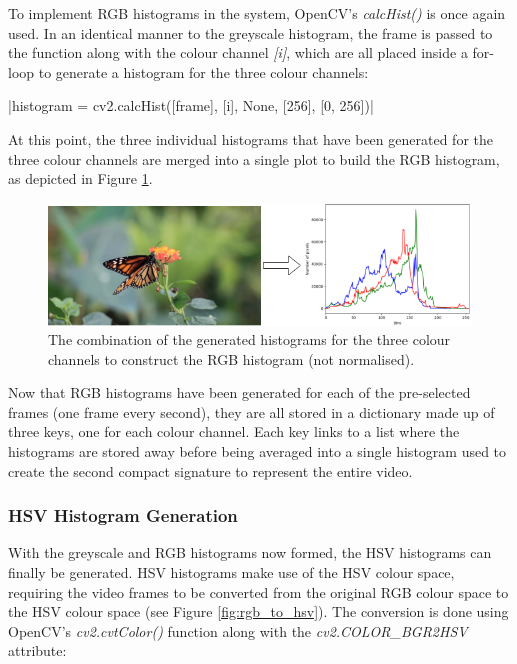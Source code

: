 To implement RGB histograms in the system, OpenCV's \textit{calcHist()} is once again used. In an identical manner to the greyscale histogram, the frame is passed to the function along with the colour channel \textit{[i]}, which are all placed inside a for-loop to generate a histogram for the three colour channels:

|histogram = cv2.calcHist([frame], [i], None, [256], [0, 256])|

At this point, the three individual histograms that have been generated for the three colour channels are merged into a single plot to build the RGB histogram, as depicted in Figure \ref{fig:implementation-rgb_not_normalised}.

\begin{figure}[h] 
\centerline{\includegraphics[width=\textwidth]{figures/implementation/rgb_not_normalised.png}}
\caption{\label{fig:implementation-rgb_not_normalised}The combination of the generated histograms for the three colour channels to construct the RGB histogram (not normalised).}
\end{figure}

Now that RGB histograms have been generated for each of the pre-selected frames (one frame every second), they are all stored in a dictionary made up of three keys, one for each colour channel. Each key links to a list where the histograms are stored away before being averaged into a single histogram used to create the second compact signature to represent the entire video. 


\subsubsection{HSV Histogram Generation}

With the greyscale and RGB histograms now formed, the HSV histograms can finally be generated. HSV histograms make use of the HSV colour space, requiring the video frames to be converted from the original RGB colour space to the HSV colour space (see Figure \ref{fig:rgb_to_hsv}). The conversion is done using OpenCV's \textit{cv2.cvtColor()} function along with the \textit{cv2.COLOR\_BGR2HSV} attribute:

